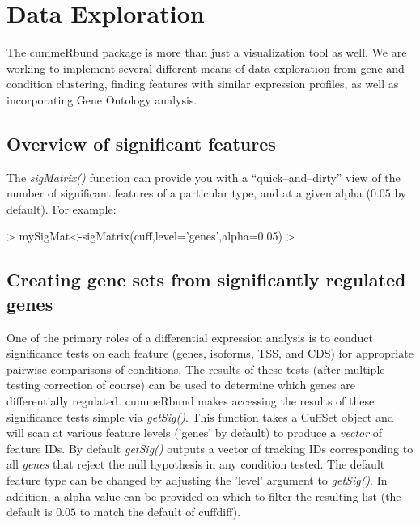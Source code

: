 \documentclass[10pt]{article}
\newcommand{\Rpackage}[1]{\textsf{#1}}
\newcommand{\Rclass}[1]{{\textit{#1}}}
\newcommand{\Rmethod}[1]{{\textit{#1}}}
\begin{document}
\clearpage

\section{Data Exploration}
The cummeRbund package is more than just a visualization tool as well.  We are working to implement several different means of data exploration from gene and condition clustering, finding features with similar expression profiles, as well as incorporating Gene Ontology analysis.

\subsection{Overview of significant features}
The \Rmethod{sigMatrix()} function can provide you with a ``quick--and--dirty''
view of the number of significant features of a particular type, and at a given alpha ($0.05$ by default). For example:

\begin{Schunk}
\begin{Sinput}
> mySigMat<-sigMatrix(cuff,level='genes',alpha=0.05)
> 
\end{Sinput}
\end{Schunk}

\begin{figure}[htp]
	\begin{center}
	
	\end{center}
\end{figure}

\subsection{Creating gene sets from significantly regulated genes}
One of the primary roles of a differential expression analysis is to conduct significance tests on each feature (genes, isoforms, TSS, and CDS) for appropriate pairwise comparisons of conditions. The results of these tests (after multiple testing correction of course) can be used to determine which genes are differentially regulated. 
\Rpackage{cummeRbund} makes accessing the results of these significance tests simple via \Rmethod{getSig()}. This function takes a CuffSet object and will scan at various feature levels ('genes' by default) to produce a \Rclass{vector} of feature IDs.
By default \Rmethod{getSig()} outputs a vector of tracking IDs corresponding to all \emph{genes} that reject the null hypothesis in any condition tested. The default feature type can be changed by adjusting the 'level' argument to \Rmethod{getSig()}. In addition, a alpha value can be provided on which to filter the resulting list
(the default is $0.05$ to match the default of cuffdiff). 
\end{document}
